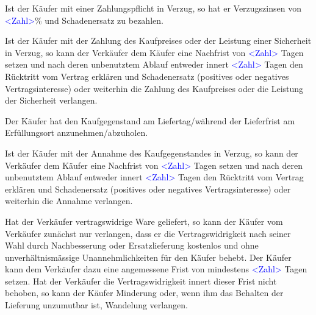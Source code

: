 \documentclass[parskip=half]{scrreprt}
\begin{document}
\begin{contract}
Ist der Käufer mit einer Zahlungspflicht in Verzug, so hat er Verzugszinsen von \textcolor{blue}{<Zahl>}\% und Schadenersatz zu bezahlen.

Ist der Käufer mit der Zahlung des Kaufpreises oder der Leistung einer Sicherheit in Verzug, so kann der Verkäufer dem Käufer eine Nachfrist von \textcolor{blue}{<Zahl>} Tagen setzen und nach deren unbenutztem Ablauf entweder innert \textcolor{blue}{<Zahl>} Tagen den Rücktritt vom Vertrag erklären und Schadenersatz (positives oder negatives Vertragsinteresse) oder weiterhin die Zahlung des Kaufpreises oder die Leistung der Sicherheit verlangen.


Der Käufer hat den Kaufgegenstand am Liefertag/während der Lieferfrist am Erfüllungsort anzunehmen/abzuholen.

Ist der Käufer mit der Annahme des Kaufgegenstandes in Verzug, so kann der Verkäufer dem Käufer eine Nachfrist von \textcolor{blue}{<Zahl>} Tagen setzen und nach deren unbenutztem Ablauf entweder innert \textcolor{blue}{<Zahl>} Tagen den Rücktritt vom Vertrag erklären und Schadenersatz (positives oder negatives Vertragsinteresse) oder weiterhin die Annahme verlangen.

\parnumbertrue





Hat der Verkäufer vertragswidrige Ware geliefert, so kann der Käufer vom Verkäufer zunächst nur verlangen, dass er die Vertragswidrigkeit nach seiner Wahl durch Nachbesserung oder Ersatzlieferung kostenlos und ohne unverhältnismässige Unannehmlichkeiten für den Käufer behebt. Der Käufer kann dem Verkäufer dazu eine angemessene Frist von mindestens \textcolor{blue}{<Zahl>} Tagen setzen. Hat der Verkäufer die Vertragswidrigkeit innert dieser Frist nicht behoben, so kann der Käufer Minderung oder, wenn ihm das Behalten der Lieferung unzumutbar ist, Wandelung verlangen.



\end{contract}
\end{document}
